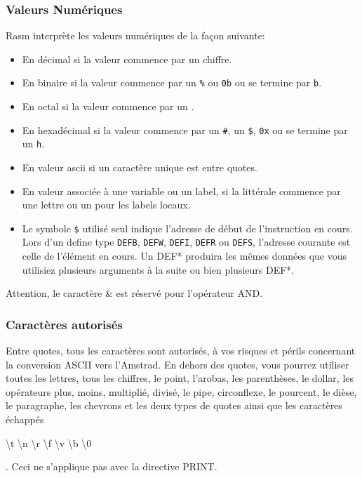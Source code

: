 \begin{xfr}

\subsubsection{Valeurs Numériques}

Rasm interprète les valeurs numériques de la façon suivante:

\begin{itemize}
  \item En décimal si la valeur commence par un chiffre.
  \item En binaire si la valeur commence par un \texttt{\%} ou \texttt{0b} ou se termine par \texttt{b}.
  \item En octal si la valeur commence par un \texttt{\at}.
  \item En hexadécimal si la valeur commence par un \texttt{\#}, un \texttt{\$}, \texttt{0x} ou se termine par un \texttt{h}.
  \item En valeur ascii si un caractère unique est entre quotes. %
  \item En valeur associée à une variable ou un label, si la littérale commence par une lettre ou un \texttt{\at} pour les labels locaux.
  \item Le symbole \texttt{\$} utilisé seul indique l'adresse de début de l'instruction en cours. Lors d'un define type \texttt{DEFB}, \texttt{DEFW}, \texttt{DEFI}, \texttt{DEFR} ou \texttt{DEFS}, l'adresse courante est celle de l'élément en cours. Un DEF* produira les mêmes données que vous utilisiez plusieurs arguments à la suite ou bien plusieurs DEF*.
\end{itemize}

Attention, le caractère \& est réservé pour l'opérateur AND.

\subsubsection{Caractères autorisés}
Entre quotes, tous les caractères sont autorisés, à vos risques et périls concernant la conversion ASCII vers l'Amstrad. En dehors des quotes, vous pourrez utiliser toutes les lettres, tous les chiffres, le point, l'arobas, les parenthèses, le dollar, les opérateurs plus, moins, multiplié, divisé, le pipe, circonflexe, le pourcent, le dièse, le paragraphe, les chevrons et les deux types de quotes ainsi que les caractères échappés \begin{ttfamily} \textbackslash t \textbackslash n  \textbackslash r \textbackslash f \textbackslash v \textbackslash b \textbackslash 0 \end{ttfamily}.
Ceci ne s'applique pas avec la directive PRINT. %
\end{xfr}


